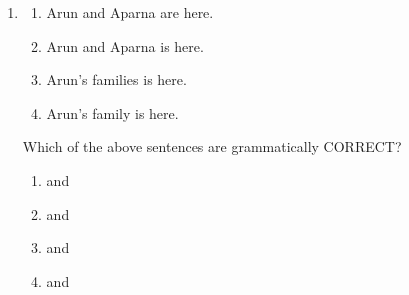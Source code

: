 \documentclass[journal,12pt,onecolumn]{article}
\theoremstyle{remark}
\begin{document}
\begin{enumerate}
\item 
\begin{enumerate}
    \item[\brak{i}] Arun and Aparna are here.
    \item[\brak{ii}] Arun and Aparna is here.
    \item[\brak{iii}] Arun's families is here.
    \item[\brak{iv}] Arun's family is here.
\end{enumerate}
Which of the above sentences are grammatically CORRECT?

\hfill{}

\begin{multicols}{2}
\begin{enumerate}
    \item {} and 
    \item {} and 
    \item {} and 
    \item {} and 
\end{enumerate}
\end{multicols}


\end{enumerate}
\end{document}
